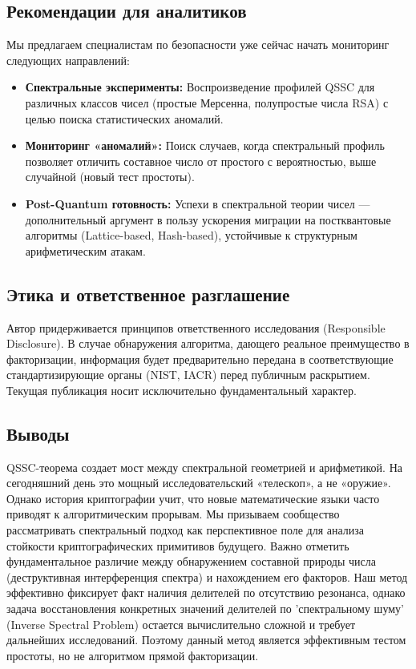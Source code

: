 \documentclass{article}
\numberwithin{equation}{section}
\theoremstyle{plain}
\theoremstyle{definition}
\theoremstyle{remark}
\begin{document}
\subsection*{Рекомендации для аналитиков}
Мы предлагаем специалистам по безопасности уже сейчас начать мониторинг следующих направлений:
\begin{itemize}
    \item \textbf{Спектральные эксперименты:} Воспроизведение профилей QSSC для различных классов чисел (простые Мерсенна, полупростые числа RSA) с целью поиска статистических аномалий.
    \item \textbf{Мониторинг «аномалий»:} Поиск случаев, когда спектральный профиль позволяет отличить составное число от простого с вероятностью, выше случайной (новый тест простоты).
    \item \textbf{Post-Quantum готовность:} Успехи в спектральной теории чисел — дополнительный аргумент в пользу ускорения миграции на постквантовые алгоритмы (Lattice-based, Hash-based), устойчивые к структурным арифметическим атакам.
\end{itemize}

\subsection*{Этика и ответственное разглашение}
Автор придерживается принципов ответственного исследования (Responsible Disclosure). В случае обнаружения алгоритма, дающего реальное преимущество в факторизации, информация будет предварительно передана в соответствующие стандартизирующие органы (NIST, IACR) перед публичным раскрытием.
Текущая публикация носит исключительно фундаментальный характер.

\subsection*{Выводы}
QSSC-теорема создает мост между спектральной геометрией и арифметикой. На сегодняшний день это мощный исследовательский «телескоп», а не «оружие». 
Однако история криптографии учит, что новые математические языки часто приводят к алгоритмическим прорывам. 
Мы призываем сообщество рассматривать спектральный подход как перспективное поле для анализа стойкости криптографических примитивов будущего.
Важно отметить фундаментальное различие между обнаружением составной природы числа (деструктивная интерференция спектра) и 
нахождением его факторов. Наш метод эффективно фиксирует факт наличия делителей по отсутствию резонанса, 
однако задача восстановления конкретных значений делителей по 'спектральному шуму' (Inverse Spectral Problem) 
остается вычислительно сложной и требует дальнейших исследований. Поэтому данный метод является эффективным 
тестом простоты, но не алгоритмом прямой факторизации.
\clearpage
\end{document}
